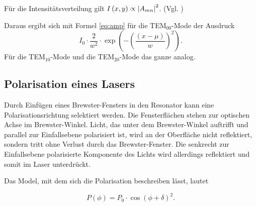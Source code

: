 Für die Intensitätsverteilung gilt $I\left(x,y\right) \propto \absolutevalue{A_{mn}}^2$. (Vgl. \cite{Laserspektroskopie})

Daraus ergibt sich mit Formel \eqref{eq:amp} für die 
TEM$_{00}$-Mode der Ausdruck 
\begin{equation}
    I_0 \cdot \frac{2}{w^2} \cdot \exp\left(-\left(\frac{(x - \mu)}{w}\right)^2\right).
    \label{eq:mode0}
\end{equation}
Für die TEM$_{10}$-Mode und die TEM$_{20}$-Mode das ganze analog.










\subsection{Polarisation eines Lasers}
Durch Einfügen eines Brewster-Fensters in den Resonator kann eine Polarisationsrichtung selektiert werden.
Die Fensterflächen stehen  zur optischen Achse im Brewster-Winkel. Licht, das unter dem Brewster-Winkel auftrifft und parallel zur Einfallsebene polarisiert ist, wird an der Oberfläche nicht reflektiert, sondern tritt ohne Verlust durch das Brewster-Fenster. Die senkrecht zur Einfallsebene polarisierte Komponente des Lichts wird allerdings reflektiert und somit im Laser unterdrückt.

Das Model, mit dem sich die Polarisation beschreiben lässt, lautet 

\begin{equation}
    P(\phi) = P_0 \cdot \cos\left( \phi + \delta \right)^2. 
    \label{eq:polar}
\end{equation}
